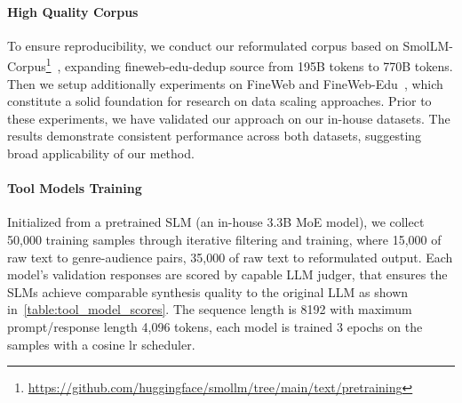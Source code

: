 \paragraph{High Quality Corpus}
To ensure reproducibility, we conduct our reformulated corpus based on SmolLM-Corpus\footnote{\url{https://github.com/huggingface/smollm/tree/main/text/pretraining}}~\citep{benallal2024smollmcorpus}, expanding fineweb-edu-dedup source from 195B tokens to 770B tokens.
Then we setup additionally experiments on FineWeb and FineWeb-Edu~\citep{penedo2024finewebdatasets},
which constitute a solid foundation for research on data scaling approaches.
Prior to these experiments, we have validated our approach on our in-house datasets.
The results demonstrate consistent performance across both datasets, suggesting broad applicability of our method.





\paragraph{Tool Models Training}
Initialized from a pretrained SLM (an in-house 3.3B MoE model), we collect 50,000 training samples through iterative filtering and training, where 15,000 of raw text to genre-audience pairs, 35,000 of raw text to reformulated output.
Each model's validation responses are scored by capable LLM judger, that ensures the SLMs achieve comparable synthesis quality to the original LLM as shown in~\autoref{table:tool_model_scores}.
The sequence length is 8192 with maximum prompt/response length 4,096 tokens, each model is trained 3 epochs on the samples with a cosine lr scheduler.

